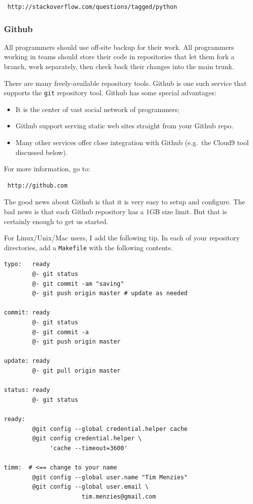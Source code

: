 \begin{lstlisting}
 http://stackoverflow.com/questions/tagged/python
\end{lstlisting}

\subsubsection{Github}\label{github}

All programmers should use off-site backup for their work. All
programmers working in teams should store their code in repositories
that let them fork a branch, work separately, then check back their
changes into the main trunk.

There are many freely-available repository tools. Github is one such
service that supports the \texttt{git} repository tool. Github has some
special advantages:

\begin{itemize}
\itemsep1pt\parskip0pt
\item
  It is the center of vast social network of programmers;
\item
  Github support serving static web sites straight from your Github
  repo.
\item
  Many other services offer close integration with Github (e.g.~the
  Cloud9 tool discussed below).
\end{itemize}

For more information, go to:

\begin{lstlisting}
 http://github.com
\end{lstlisting}

The good news about Github is that it is very easy to setup and
configure. The bad news is that each Github repository has a 1GB size
limit. But that is certainly enough to get us started.

For Linux/Unix/Mac users, I add the following tip. In each of your
repository directories, add a \texttt{Makefile} with the following
contents.

\begin{lstlisting}
typo:   ready
        @- git status
        @- git commit -am "saving"
        @- git push origin master # update as needed

commit: ready
        @- git status
        @- git commit -a
        @- git push origin master

update: ready
        @- git pull origin master

status: ready
        @- git status

ready:
        @git config --global credential.helper cache
        @git config credential.helper \
             'cache --timeout=3600'

timm:  # <== change to your name
        @git config --global user.name "Tim Menzies"
        @git config --global user.email \
                      tim.menzies@gmail.com
\end{lstlisting}


